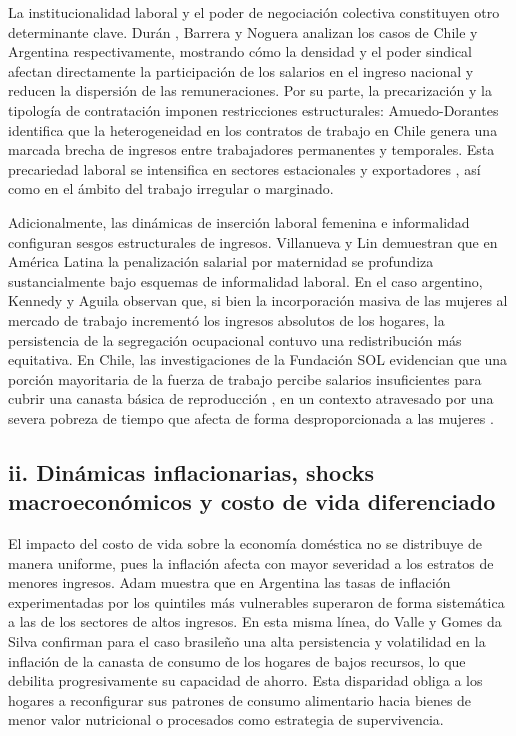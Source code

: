 La institucionalidad laboral y el poder de negociación colectiva constituyen otro determinante clave. Durán \parencite*{DuranS2026}, Barrera y Noguera \parencite*{BarreraInsuaNoguera2026} analizan los casos de Chile y Argentina respectivamente, mostrando cómo la densidad y el poder sindical afectan directamente la participación de los salarios en el ingreso nacional y reducen la dispersión de las remuneraciones. Por su parte, la precarización y la tipología de contratación imponen restricciones estructurales: Amuedo-Dorantes \parencite*{Amuedo-Dorantes2005} identifica que la heterogeneidad en los contratos de trabajo en Chile genera una marcada brecha de ingresos entre trabajadores permanentes y temporales. Esta precariedad laboral se intensifica en sectores estacionales y exportadores \parencite{TapiaCatalanMarchantSantiago2025}, así como en el ámbito del trabajo irregular o marginado.

Adicionalmente, las dinámicas de inserción laboral femenina e informalidad configuran sesgos estructurales de ingresos. Villanueva y Lin \parencite*{VillanuevaLin2020} demuestran que en América Latina la penalización salarial por maternidad se profundiza sustancialmente bajo esquemas de informalidad laboral. En el caso argentino, Kennedy y Aguila \parencite*{KennedyAguila2021} observan que, si bien la incorporación masiva de las mujeres al mercado de trabajo incrementó los ingresos absolutos de los hogares, la persistencia de la segregación ocupacional contuvo una redistribución más equitativa. En Chile, las investigaciones de la Fundación SOL evidencian que una porción mayoritaria de la fuerza de trabajo percibe salarios insuficientes para cubrir una canasta básica de reproducción \parencite{DuranKremerman2024}, en un contexto atravesado por una severa pobreza de tiempo que afecta de forma desproporcionada a las mujeres \parencite{barrigaMujeresPobrezaTiempo2025}.

\subsection{ii. Dinámicas inflacionarias, shocks macroeconómicos y costo de vida diferenciado}

El impacto del costo de vida sobre la economía doméstica no se distribuye de manera uniforme, pues la inflación afecta con mayor severidad a los estratos de menores ingresos. Adam \parencite*{Adam2025} muestra que en Argentina las tasas de inflación experimentadas por los quintiles más vulnerables superaron de forma sistemática a las de los sectores de altos ingresos. En esta misma línea, do Valle y Gomes da Silva \parencite*{doValleGomesdaSilva2026} confirman para el caso brasileño una alta persistencia y volatilidad en la inflación de la canasta de consumo de los hogares de bajos recursos, lo que debilita progresivamente su capacidad de ahorro. Esta disparidad obliga a los hogares a reconfigurar sus patrones de consumo alimentario \parencite{Nessieretal2026, SilvaCanellaetal2026} hacia bienes de menor valor nutricional o procesados como estrategia de supervivencia.

